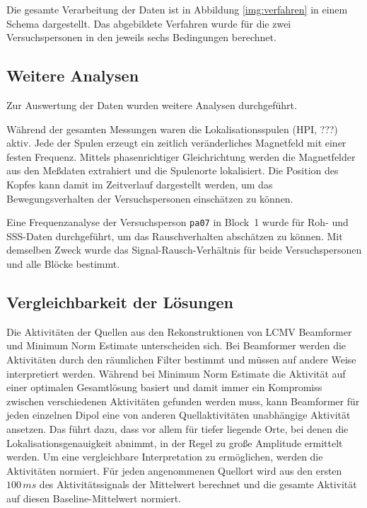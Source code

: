 \documentclass[doc,a4paper,12pt]{apa6}
\begin{document}
Die gesamte Verarbeitung der Daten ist in Abbildung \ref{img:verfahren} in einem Schema dargestellt. Das abgebildete Verfahren wurde für die zwei Versuchspersonen in den jeweils sechs Bedingungen berechnet.

\subsection{Weitere Analysen}

Zur Auswertung der Daten wurden weitere Analysen durchgeführt.

Während der gesamten Messungen waren die Lokalisationsspulen (HPI, ???) aktiv. Jede der Spulen erzeugt ein zeitlich veränderliches Magnetfeld mit einer festen Frequenz. Mittels phasenrichtiger Gleichrichtung werden die Magnetfelder aus den Meßdaten extrahiert und die Spulenorte lokalisiert. Die Position des Kopfes kann damit im Zeitverlauf dargestellt werden, um das Bewegungsverhalten der Versuchspersonen einschätzen zu können.

Eine Frequenzanalyse der Versuchsperson \texttt{pa07} in Block~1 wurde für Roh- und SSS-Daten durchgeführt, um das Rauschverhalten abschätzen zu können. Mit demselben Zweck wurde das Signal-Rausch-Verhältnis für beide Versuchspersonen und alle Blöcke bestimmt.

\subsection{Vergleichbarkeit der Lösungen}
\label{sec:amplitud}

Die Aktivitäten der Quellen aus den Rekonstruktionen von LCMV Beamformer und Minimum Norm Estimate unterscheiden sich. Bei Beamformer werden die Aktivitäten durch den räumlichen Filter bestimmt und müssen auf andere Weise interpretiert werden. Während bei Minimum Norm Estimate die Aktivität auf einer optimalen Gesamtlösung basiert und damit immer ein Kompromiss zwischen verschiedenen Aktivitäten gefunden werden muss, kann Beamformer für jeden einzelnen Dipol eine von anderen Quellaktivitäten unabhängige Aktivität ansetzen. Das führt dazu, dass vor allem für tiefer liegende Orte, bei denen die Lokalisationsgenauigkeit abnimmt, in der Regel zu große Amplitude ermittelt werden. Um eine vergleichbare Interpretation zu ermöglichen, werden die Aktivitäten normiert. Für jeden angenommenen Quellort wird aus den ersten $100\,ms$ des Aktivitätssignals der Mittelwert berechnet und die gesamte Aktivität auf diesen Baseline-Mittelwert normiert.
\end{document}
